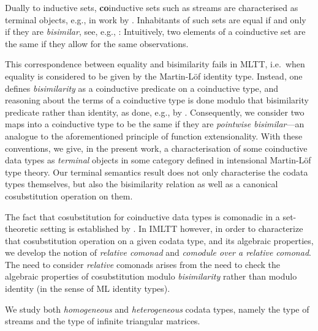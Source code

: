 \documentclass{amsart}
\newcommand{\fat}[1]{\textbf{#1}}
\begin{document}
 Dually to inductive sets, \fat{co}inductive sets such as streams are characterised as terminal objects, e.g., in work by \textcite{jacobs1997tutorial}.
 Inhabitants of such sets are equal if and only if they are \emph{bisimilar}, see, e.g., \textcite{DBLP:journals/mscs/TuriR98}:
 Intuitively, two elements of a coinductive set are the same if they allow for the same observations.
 
 This correspondence between equality and bisimilarity fails in MLTT, i.e.\ when equality is considered to be given by the 
 Martin-L\"of identity type. Instead, one defines \emph{bisimilarity} as a coinductive predicate 
 on a coinductive type, and reasoning about the terms of a coinductive type is done modulo that bisimilarity predicate
 rather than identity, as done, e.g., by \textcite{DBLP:conf/types/Coquand93}.
 Consequently, we consider two maps into a coinductive type to be the same if they are \emph{pointwise bisimilar}---an analogue
 to the aforementioned principle of function extensionality. 
 With these conventions, we give, in the present work, a characterisation of some coinductive data types as \emph{terminal} objects in some category 
 defined in intensional Martin-L\"of type theory.
 Our terminal semantics result does not only characterise the codata types themselves, but also the bisimilarity relation as well as
 a canonical cosubstitution operation on them.
 
 The fact that cosubstitution for coinductive data types is comonadic in a set-theoretic setting is established by \textcite{DBLP:conf/sfp/UustaluV01}.
 In IMLTT however, in order to characterize that cosubstitution operation on a given codata type, and its algebraic properties,
 we develop the notion of \emph{relative comonad} and \emph{comodule over a relative comonad}.
 The need to consider \emph{relative} comonads arises from the  need to check the algebraic properties of cosubstitution modulo \emph{bisimilarity} rather
 than modulo identity (in the sense of ML identity types).
 
 We study both \emph{homogeneous}  and \emph{heterogeneous} codata types, namely the type of streams and the type of infinite triangular matrices.

 
%  
%  
 
\end{document}

